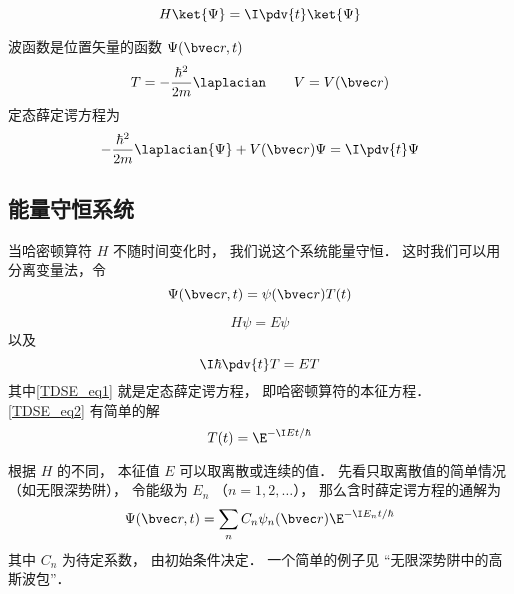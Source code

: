 
\begin{issues}
\issueDraft
\issueAbstract
\end{issues}


\begin{equation}
H \ket{\Psi} = \I \pdv{t} \ket{\Psi}
\end{equation}


波函数是位置矢量的函数 $\Psi(\bvec r, t)$
\begin{equation}
T = -\frac{\hbar^2}{2m} \laplacian \qquad V = V(\bvec r)
\end{equation}
定态薛定谔方程为
\begin{equation}
-\frac{\hbar^2}{2m} \laplacian {\Psi} + V(\bvec r)\Psi = \I \pdv{t} \Psi
\end{equation}

\subsection{能量守恒系统}
当哈密顿算符 $H$ 不随时间变化时， 我们说这个系统能量守恒． 这时我们可以用分离变量法，令
\begin{equation}
\Psi(\bvec r, t) = \psi(\bvec r) T(t)
\end{equation}
 
\begin{equation}\label{TDSE_eq1}
H\psi = E\psi
\end{equation}
以及
\begin{equation}\label{TDSE_eq2}
\I \hbar\pdv{t}T = ET
\end{equation}
其中\autoref{TDSE_eq1} 就是定态薛定谔方程， 即哈密顿算符的本征方程． \autoref{TDSE_eq2} 有简单的解
\begin{equation}
T(t) = \E^{-\I E t/\hbar}
\end{equation}

根据 $H$ 的不同， 本征值 $E$ 可以取离散或连续的值． 先看只取离散值的简单情况（如无限深势阱）， 令能级为 $E_n$ （$n = 1, 2, \dots$）， 那么含时薛定谔方程的通解为
\begin{equation}
\Psi(\bvec r, t) = \sum_n C_n \psi_n(\bvec r) \E^{-\I E_n t/\hbar}
\end{equation}
其中 $C_n$ 为待定系数， 由初始条件决定． 一个简单的例子见 “无限深势阱中的高斯波包”．

